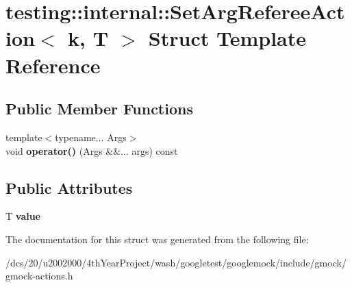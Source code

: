 \hypertarget{structtesting_1_1internal_1_1SetArgRefereeAction}{}\section{testing\+:\+:internal\+:\+:Set\+Arg\+Referee\+Action$<$ k, T $>$ Struct Template Reference}
\label{structtesting_1_1internal_1_1SetArgRefereeAction}
\subsection*{Public Member Functions}
\begin{DoxyCompactItemize}
\item 
\mbox{\label{structtesting_1_1internal_1_1SetArgRefereeAction_a8b81541081919b00bb3e32d111c15fe2}} 
{\footnotesize template$<$typename... Args$>$ }\\void {\bfseries operator()} (Args \&\&... args) const
\end{DoxyCompactItemize}
\subsection*{Public Attributes}
\begin{DoxyCompactItemize}
\item 
\mbox{\label{structtesting_1_1internal_1_1SetArgRefereeAction_a8f798e71662c48285b6eb204febbe357}} 
T {\bfseries value}
\end{DoxyCompactItemize}


The documentation for this struct was generated from the following file\+:\begin{DoxyCompactItemize}
\item 
/dcs/20/u2002000/4th\+Year\+Project/wash/googletest/googlemock/include/gmock/gmock-\/actions.\+h\end{DoxyCompactItemize}
